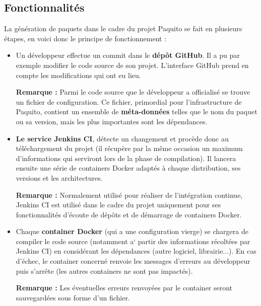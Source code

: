 \documentclass[12pt,a4paper]{article}
\newenvironment{remarque}{\textbf{Remarque :}}{}
\begin{document}
	\subsection{Fonctionnalités}
	La génération de paquets dans le cadre du projet Paquito se fait en plusieurs étapes, en voici donc le principe de fonctionnement :
	\begin{itemize}\renewcommand{\labelitemi}{$\bullet$}
		\item Un développeur effectue un commit dans le \textbf{dépôt GitHub}. Il a pu par exemple modifier le code source de son projet. L'interface GitHub prend en compte les modifications qui ont eu lieu.
		
		\begin{remarque}
			Parmi le code source que le développeur a officialisé se trouve un fichier de configuration. Ce fichier, primordial pour l'infra\-structure de Paquito, contient un ensemble de \textbf{méta-données} telles que le nom du paquet ou sa version, mais les plus importantes sont les dépendances.
		\end{remarque}
		
		\item \textbf{Le service Jenkins CI}, détecte un changement et procède donc au téléchargement du projet (il récupère par la même occasion un maximum d'informations qui serviront lors de la phase de compilation). Il lancera ensuite une série de containers Docker adaptés à chaque distribution, ses versions et les architectures.
		
		\begin{remarque}
			Normalement utilisé pour réaliser de l'intégration continue, Jenkins CI est utilisé dans le cadre du projet uniquement pour ses fonctionnalités d'écoute de dépôts et de démarrage de containers Docker.
		\end{remarque}
		
		\item Chaque \textbf{container Docker} (qui a une configuration vierge) se chargera de compiler le code source (notamment a` partir des informations récoltées par Jenkins CI) en considérant les dépendances (autre logiciel, librairie...). En cas d'échec, le container concerné renvoie les messages d'erreurs au développeur puis s'arrête (les autres containers ne sont pas impactés).
		
		\begin{remarque}
			Les éventuelles erreurs renvoyées par le container seront sauvegardées sous forme d'un fichier.
		\end{remarque}
		

\end{itemize}
\end{document}
